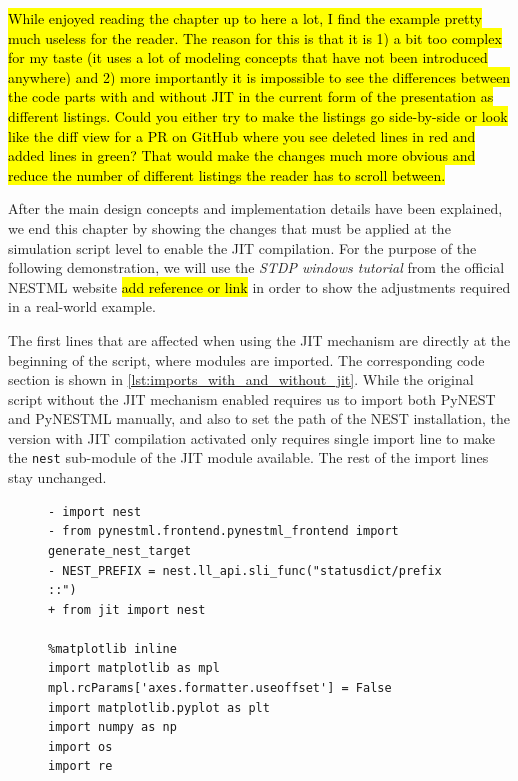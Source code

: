 \hl{While enjoyed reading the chapter up to here a lot, I find the example pretty much useless for the reader. The reason for this is that it is 1) a bit too complex for my taste (it uses a lot of modeling concepts that have not been introduced anywhere) and 2) more importantly it is impossible to see the differences between the code parts with and without JIT in the current form of the presentation as different listings. Could you either try to make the listings go side-by-side or look like the diff view for a PR on GitHub where you see deleted lines in red and added lines in green? That would make the changes much more obvious and reduce the number of different listings the reader has to scroll between.}

After the main design concepts and implementation details have been explained, we end this chapter by showing the changes that must be applied at the simulation script level to enable the JIT compilation. For the purpose of the following demonstration, we will use the \emph{STDP windows tutorial} from the official NESTML website \hl{add reference or link} in order to show the adjustments required in a real-world example.

The first lines that are affected when using the JIT mechanism are directly at the beginning of the script, where modules are imported. The corresponding code section is shown in \autoref{lst:imports_with_and_without_jit}. While the original script without the JIT mechanism enabled requires us to import both PyNEST and PyNESTML manually, and also to set the path of the NEST installation, the version with JIT compilation activated only requires single import line to make the \texttt{nest} sub-module of the JIT module available. The rest of the import lines stay unchanged.

\begin{figure}[ht!]
\centering
\begin{lstlisting}[language=Pydiff, label=lst:imports_with_and_without_jit, caption={The Simulation script imports with and without the JIT mechanism enabled. Lines that are necessary without are shown in red, lines in the new version are shown in green.}]
- import nest
- from pynestml.frontend.pynestml_frontend import generate_nest_target
- NEST_PREFIX = nest.ll_api.sli_func("statusdict/prefix ::")
+ from jit import nest

%matplotlib inline
import matplotlib as mpl
mpl.rcParams['axes.formatter.useoffset'] = False
import matplotlib.pyplot as plt
import numpy as np
import os
import re
\end{lstlisting}
\end{figure}

